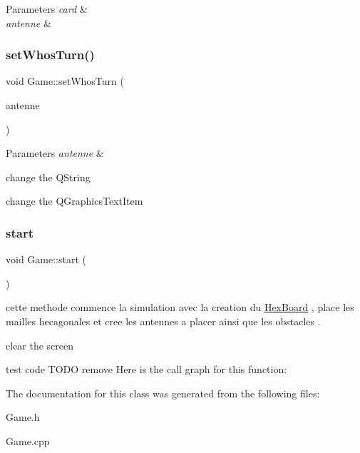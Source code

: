\begin{DoxyParams}{Parameters}
{\em card} & \\
\hline
{\em antenne} & \\
\hline
\end{DoxyParams}
\mbox{\label{class_game_aa7c694cceaeae66edda49a0e52059929}} 
\subsubsection{\texorpdfstring{setWhosTurn()}{setWhosTurn()}}
{\footnotesize\ttfamily void Game\+::set\+Whos\+Turn (\begin{DoxyParamCaption}\item[{Q\+String}]{antenne }\end{DoxyParamCaption})}


\begin{DoxyParams}{Parameters}
{\em antenne} & \\
\hline
\end{DoxyParams}
change the Q\+String

change the Q\+Graphics\+Text\+Item \mbox{\label{class_game_a3d9b98f7c4a96ecf578f75b96c9f0e90}} 
\subsubsection{\texorpdfstring{start}{start}}
{\footnotesize\ttfamily void Game\+::start (\begin{DoxyParamCaption}{ }\end{DoxyParamCaption})\hspace{0.3cm}{\ttfamily [slot]}}



cette methode commence la simulation avec la creation du \mbox{\hyperlink{class_hex_board}{Hex\+Board}} , place les mailles hecagonales et cree les antennes a placer ainsi que les obstacles . 

clear the screen

test code T\+O\+DO remove Here is the call graph for this function\+:


The documentation for this class was generated from the following files\+:\begin{DoxyCompactItemize}
\item 
Game.\+h\item 
Game.\+cpp\end{DoxyCompactItemize}

